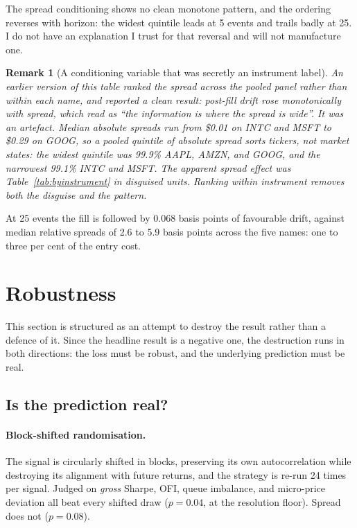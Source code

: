 \documentclass[11pt]{scrartcl}
\newtheorem{remark}{Remark}[section]
\begin{document}
The spread conditioning shows no clean monotone pattern, and the ordering reverses with horizon: the widest quintile leads at 5 events and trails badly at 25. I do not have an explanation I trust for that reversal and will not manufacture one.

\begin{remark}[A conditioning variable that was secretly an instrument label]
\label{rem:conditioning}
An earlier version of this table ranked the spread across the pooled panel rather than within each name, and reported a clean result: post-fill drift rose monotonically with spread, which read as ``the information is where the spread is wide''. It was an artefact. Median absolute spreads run from \$0.01 on INTC and MSFT to \$0.29 on GOOG, so a pooled quintile of absolute spread sorts tickers, not market states: the widest quintile was 99.9\% AAPL, AMZN, and GOOG, and the narrowest 99.1\% INTC and MSFT. The apparent spread effect was Table~\ref{tab:byinstrument} in disguised units. Ranking within instrument removes both the disguise and the pattern.
\end{remark}

At 25 events the fill is followed by 0.068 basis points of favourable drift, against median relative spreads of 2.6 to 5.9 basis points across the five names: one to three per cent of the entry cost.

\section{Robustness}
\label{sec:robustness}

This section is structured as an attempt to destroy the result rather than a defence of it. Since the headline result is a negative one, the destruction runs in both directions: the loss must be robust, and the underlying prediction must be real.

\subsection{Is the prediction real?}
\label{sec:isreal}

\paragraph{Block-shifted randomisation.} The signal is circularly shifted in blocks, preserving its own autocorrelation while destroying its alignment with future returns, and the strategy is re-run 24 times per signal. Judged on \emph{gross} Sharpe, OFI, queue imbalance, and micro-price deviation all beat every shifted draw ($p = 0.04$, at the resolution floor). Spread does not ($p = 0.08$).
\end{document}
